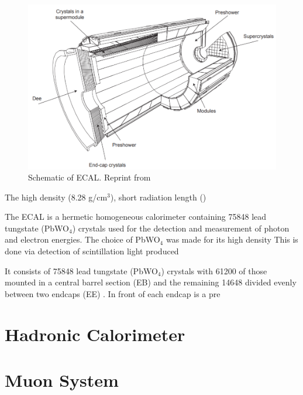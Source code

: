  \begin{figure}[h]
 	\centering
 	\includegraphics[width=0.7\linewidth]{Figures/ECAL_layout}
 	\caption{Schematic of ECAL. Reprint from \cite{Collaboration_2008}}
 	\label{fig:ecallayout}
 \end{figure}
 
 
The high density (8.28 g/cm$^{3}$), short radiation length ()

The ECAL is a hermetic homogeneous calorimeter containing 75848 lead tungstate (PbWO$_{4}$) crystals used for the detection and measurement of photon and electron energies.  The choice of PbWO$_{4}$ was made for its high density 
This is done via detection of scintillation light produced


It consists of 75848 lead tungstate (PbWO$_{4}$) crystals with 61200 of those mounted in a central barrel section (EB) and the remaining 14648 divided evenly between two endcaps (EE) \cite{Collaboration_2008}.  In front of each endcap is a pre


\section{Hadronic Calorimeter}

\section{Muon System}

